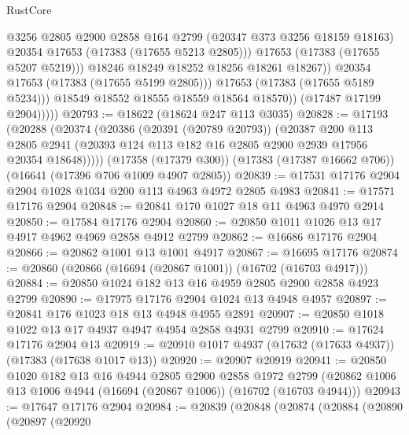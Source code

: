 \begin{lexlean}{RustCore}
\begin{coremodule}
                            @3256
                            @2805
                            @2900
                            @2858
                            @164
                            @2799
                            (@20347 @373 @3256 @18159 @18163)
                            @20354
                            @17653
                            (@17383 (@17655 @5213 @2805)))
                          @17653
                          (@17383 (@17655 @5207 @5219)))
                        @18246
                        @18249
                        @18252
                        @18256
                        @18261
                        @18267))
                    @20354
                    @17653
                    (@17383 (@17655 @5199 @2805)))
                  @17653
                  (@17383 (@17655 @5189 @5234)))
                @18549
                @18552
                @18555
                @18559
                @18564
                @18570))
            (@17487 @17199 @2904)))))
@20793 := @18622 (@18624 @247 @113 @3035)
@20828 := @17193
    (@20288
      (@20374
        (@20386
          (@20391 (@20789 @20793))
          (@20387
            @200
            @113
            @2805
            @2941
            (@20393 @124 @113 @182 @16 @2805 @2900 @2939 @17956 @20354 @18648)))))
    (@17358 (@17379 @300))
    (@17383 (@17387 @16662 @706))
    (@16641 (@17396 @706 @1009 @4907 @2805))
@20839 := @17531 @17176 @2904 @2904 @1028 @1034 @200 @113 @4963 @4972 @2805 @4983
@20841 := @17571 @17176 @2904
@20848 := @20841 @170 @1027 @18 @11 @4963 @4970 @2914
@20850 := @17584 @17176 @2904
@20860 := @20850 @1011 @1026 @13 @17 @4917 @4962 @4969 @2858 @4912 @2799
@20862 := @16686 @17176 @2904
@20866 := @20862 @1001 @13 @1001 @4917
@20867 := @16695 @17176
@20874 := @20860 (@20866 (@16694 (@20867 @1001)) (@16702 (@16703 @4917)))
@20884 := @20850 @1024 @182 @13 @16 @4959 @2805 @2900 @2858 @4923 @2799
@20890 := @17975 @17176 @2904 @1024 @13 @4948 @4957
@20897 := @20841 @176 @1023 @18 @13 @4948 @4955 @2891
@20907 := @20850 @1018 @1022 @13 @17 @4937 @4947 @4954 @2858 @4931 @2799
@20910 := @17624 @17176 @2904 @13
@20919 := @20910 @1017 @4937 (@17632 (@17633 @4937)) (@17383 (@17638 @1017 @13))
@20920 := @20907 @20919
@20941 := @20850
    @1020
    @182
    @13
    @16
    @4944
    @2805
    @2900
    @2858
    @1972
    @2799
    (@20862 @1006 @13 @1006 @4944 (@16694 (@20867 @1006)) (@16702 (@16703 @4944)))
@20943 := @17647 @17176 @2904
@20984 := @20839
    (@20848
      (@20874
        (@20884
          (@20890
            (@20897
              (@20920

\end{coremodule}
\end{lexlean}
